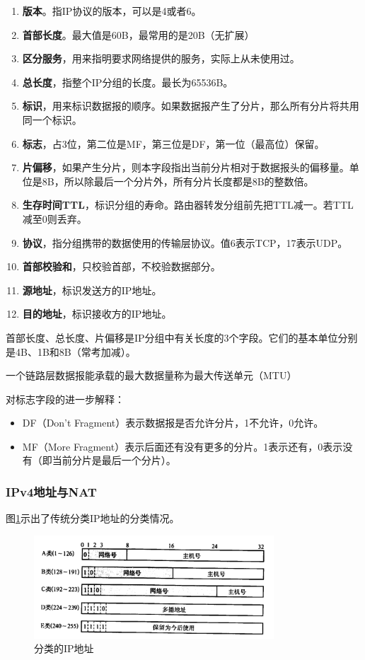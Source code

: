 \documentclass[12pt, a4paper, oneside]{ctexart}
\begin{document}
\begin{enumerate}
    \item {\bf 版本}。指IP协议的版本，可以是4或者6。
    \item {\bf 首部长度}。最大值是60B，最常用的是20B（无扩展）
    \item {\bf 区分服务}，用来指明要求网络提供的服务，实际上从未使用过。
    \item {\bf 总长度}，指整个IP分组的长度。最长为65536B。
    \item {\bf 标识}，用来标识数据报的顺序。如果数据报产生了分片，那么所有分片将共用同一个标识。
    \item {\bf 标志}，占3位，第二位是MF，第三位是DF，第一位（最高位）保留。
    \item {\bf 片偏移}，如果产生分片，则本字段指出当前分片相对于数据报头的偏移量。单位是8B，所以除最后一个分片外，所有分片长度都是8B的整数倍。
    \item {\bf 生存时间TTL}，标识分组的寿命。路由器转发分组前先把TTL减一。若TTL减至0则丢弃。
    \item {\bf 协议}，指分组携带的数据使用的传输层协议。值6表示TCP，17表示UDP。
    \item {\bf 首部校验和}，只校验首部，不校验数据部分。
    \item {\bf 源地址}，标识发送方的IP地址。
    \item {\bf 目的地址}，标识接收方的IP地址。
\end{enumerate}

首部长度、总长度、片偏移是IP分组中有关长度的3个字段。它们的基本单位分别是4B、1B和8B（常考加减）。

一个链路层数据报能承载的最大数据量称为最大传送单元（MTU）

对标志字段的进一步解释：
\begin{itemize}
    \item DF（Don't Fragment）表示数据报是否允许分片，1不允许，0允许。
    \item MF（More Fragment）表示后面还有没有更多的分片。1表示还有，0表示没有（即当前分片是最后一个分片）。
\end{itemize}

\subsubsection{IPv4地址与NAT}

图\ref{ip_classes}示出了传统分类IP地址的分类情况。

\begin{figure}[h]
    \centering
    \includegraphics[width=0.8\textwidth]{./images/ip_address.png}
    \caption{分类的IP地址}
    \label{ip_classes}
\end{figure}
\end{document}
